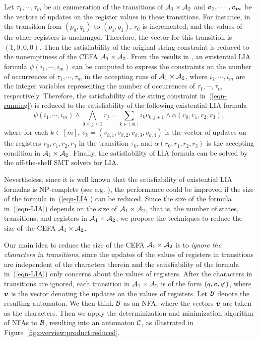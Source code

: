 Let $\tau_1, \cdots, \tau_m$ be an enumeration of the transitions of $\mathcal{A}_1 \times \mathcal{A}_2$ and $\myvec{v_1}, \cdots, \myvec{v_m}$ be the vectors of updates on the register values in these transitions. For instance, in the transition from $(p_0, q_1)$ to $(p_1, q_1)$, $r_0$ is incremented, and the values of the other registers is unchanged. Therefore, the vector for this transition is $(1, 0, 0, 0)$. 
Then the satisfiability of the original string constraint is reduced to the nonemptiness of the CEFA $\mathcal{A}_1 \times \mathcal{A}_2$. 
From the results in \cite{SSMH04,VSS05}, an existential LIA formula $\psi(i_1, \cdots, i_m)$ can be computed to express the constraints on the number of occurrences of $\tau_1, \cdots, \tau_m$ in the accepting runs of $\mathcal{A}_1 \times \mathcal{A}_2$, where $i_1, \cdots, i_m$ are the integer variables representing the number of occurrences of $\tau_1, \cdots, \tau_m$ respectively. 
Therefore, the satisfiability of the string constraint in~(\ref{eqn-running}) is reduced to the satisfiability of the following existential LIA formula
\begin{equation}\label{eqn-LIA}
\psi(i_1, \cdots, i_m) \wedge \bigwedge \limits_{0 \le j \le 3} r_j = \sum \limits_{k \in [m]}  i_k v_{k, j+1} \wedge \alpha(r_0, r_1, r_2, r_3),
\end{equation}
where for each $k \in [m]$, $v_k = (v_{k,1}, v_{k,2}, v_{k, 3}, v_{k, 4})$ is the vector of updates on the registers $r_0, r_1, r_2, r_3$ in the transition $\tau_k$, and $\alpha(r_0, r_1, r_2, r_3)$ is the accepting condition in $\mathcal{A}_1 \times \mathcal{A}_2$. Finally, the satisfiability of LIA formula can be solved by the off-the-shelf SMT solvers for LIA. 

Nevertheless, since it is well known that the satisfiability of existential LIA formulas is NP-complete (see e.g. \cite{Haase18}), the performance could be improved if the size of the formula in~(\ref{eqn-LIA}) can be reduced. Since the size of the formula in~(\ref{eqn-LIA}) depends on the size of $\mathcal{A}_1 \times \mathcal{A}_2$, that is, the number of states, transitions, and registers in $\mathcal{A}_1 \times \mathcal{A}_2$, we propose the techniques to reduce the size of the CEFA $\mathcal{A}_1 \times \mathcal{A}_2$.

Our main idea to reduce the size of the CEFA $\mathcal{A}_1 \times \mathcal{A}_2$ is to \emph{ignore the characters in transitions}, since the updates of the values of registers in transitions are independent of the characters therein and the satisfiability of the formula in~(\ref{eqn-LIA}) only concerns about the values of registers. After the characters in transitions are ignored, each transition in $\mathcal{A}_1 \times \mathcal{A}_2$ is of the form $(q, \myvec{v}, q')$, where $\myvec{v}$ is the vector denoting the updates on the values of registers. Let $\mathcal{B}$ denote the resulting automaton. We then think $\mathcal{B}$ as an NFA, where the vectors $\myvec{v}$ are taken as the characters. Then we apply the determinization and minimization algorithm of NFAs to $\mathcal{B}$, resulting into an automaton $\mathcal{C}$, as illustrated in Figure~\ref{fig:overview:product:reduced}.


